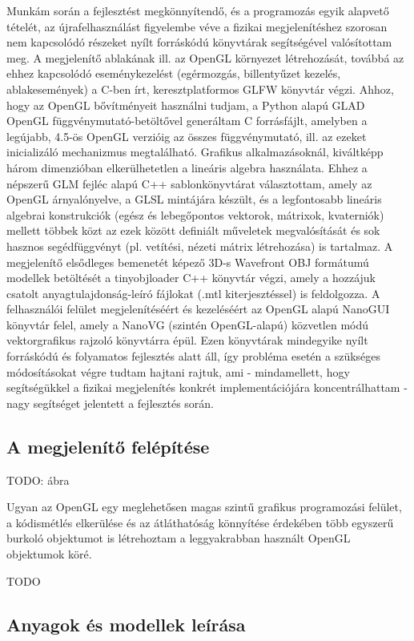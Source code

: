 Munkám során a fejlesztést megkönnyítendő, és a programozás egyik alapvető tételét, az újrafelhasználást figyelembe véve a fizikai megjelenítéshez szorosan nem kapcsolódó részeket nyílt forráskódú könyvtárak segítségével valósítottam meg. A megjelenítő ablakának ill. az OpenGL környezet létrehozását, továbbá az ehhez kapcsolódó eseménykezelést (egérmozgás, billentyűzet kezelés, ablakesemények) a C-ben írt, keresztplatformos GLFW könyvtár végzi. Ahhoz, hogy az OpenGL bővítményeit használni tudjam, a Python alapú GLAD OpenGL függvénymutató-betöltővel generáltam C forrásfájlt, amelyben a legújabb, 4.5-ös OpenGL verzióig az összes függvénymutató, ill. az ezeket inicializáló mechanizmus megtalálható. Grafikus alkalmazásoknál, kiváltképp három dimenzióban elkerülhetetlen a lineáris algebra használata. Ehhez a népszerű GLM fejléc alapú C++ sablonkönyvtárat választottam, amely az OpenGL árnyalónyelve, a GLSL mintájára készült, és a legfontosabb lineáris algebrai konstrukciók (egész és lebegőpontos vektorok, mátrixok, kvaterniók) mellett többek közt az ezek között definiált műveletek megvalósítását és sok hasznos segédfüggvényt (pl. vetítési, nézeti mátrix létrehozása) is tartalmaz. A megjelenítő elsődleges bemenetét képező 3D-s Wavefront OBJ formátumú modellek betöltését a tinyobjloader C++ könyvtár végzi, amely a hozzájuk csatolt anyagtulajdonság-leíró fájlokat (.mtl kiterjesztéssel) is feldolgozza. A felhasználói felület megjelenítéséért és kezeléséért az OpenGL alapú NanoGUI könyvtár felel, amely a NanoVG (szintén OpenGL-alapú) közvetlen módú vektorgrafikus rajzoló könyvtárra épül. Ezen könyvtárak mindegyike nyílt forráskódú és folyamatos fejlesztés alatt áll, így probléma esetén a szükséges módosításokat végre tudtam hajtani rajtuk, ami - mindamellett, hogy segítségükkel a fizikai megjelenítés konkrét implementációjára koncentrálhattam - nagy segítséget jelentett a fejlesztés során.

\subsection{A megjelenítő felépítése}

TODO: ábra

Ugyan az OpenGL egy meglehetősen magas szintű grafikus programozási felület, a kódismétlés elkerülése és az átláthatóság könnyítése érdekében több egyszerű burkoló objektumot is létrehoztam a leggyakrabban használt OpenGL objektumok köré.

TODO

\subsection{Anyagok és modellek leírása}

